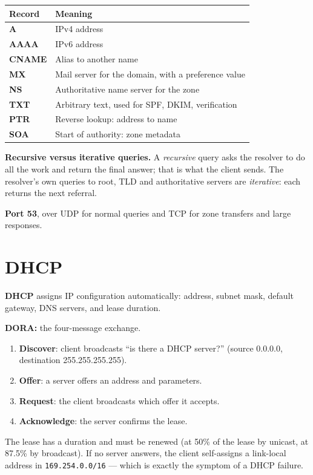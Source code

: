 \documentclass[11pt,a4paper]{article}
\begin{document}
\begin{solbox}
\begin{center}\small
\begin{tabularx}{\textwidth}{>{\bfseries}p{} X}
\toprule Record & Meaning\\
\midrule
A & IPv4 address\\
AAAA & IPv6 address\\
CNAME & Alias to another name\\
MX & Mail server for the domain, with a preference value\\
NS & Authoritative name server for the zone\\
TXT & Arbitrary text, used for SPF, DKIM, verification\\
PTR & Reverse lookup: address to name\\
SOA & Start of authority: zone metadata\\
\bottomrule
\end{tabularx}
\end{center}

\textbf{Recursive versus iterative queries.} A \emph{recursive} query asks the resolver to do all the work and return the final answer; that is what the client sends. The resolver's own queries to root, TLD and authoritative servers are \emph{iterative}: each returns the next referral.

\textbf{Port 53}, over UDP for normal queries and TCP for zone transfers and large responses.
\end{solbox}

\section{DHCP}

\textbf{DHCP} assigns IP configuration automatically: address, subnet mask, default gateway, DNS servers, and lease duration.

\begin{exambox}
\textbf{DORA:} the four-message exchange.
\begin{enumerate}
\item \textbf{Discover}: client broadcasts ``is there a DHCP server?'' (source 0.0.0.0, destination 255.255.255.255).
\item \textbf{Offer}: a server offers an address and parameters.
\item \textbf{Request}: the client broadcasts which offer it accepts.
\item \textbf{Acknowledge}: the server confirms the lease.
\end{enumerate}
The lease has a duration and must be renewed (at 50\% of the lease by unicast, at 87.5\% by broadcast). If no server answers, the client self-assigns a link-local address in \texttt{169.254.0.0/16} --- which is exactly the symptom of a DHCP failure.
\end{exambox}
\end{document}
